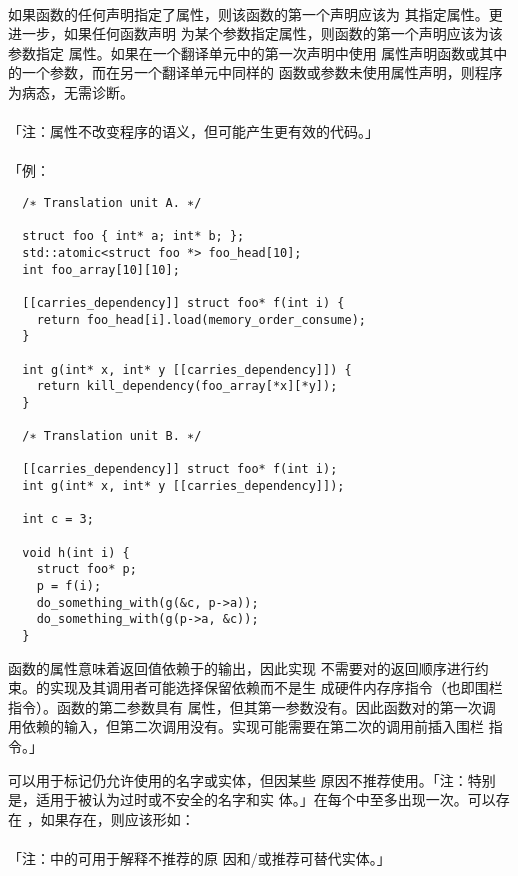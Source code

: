 \paragraph{}
如果函数的任何声明指定了属性，则该函数的第一个声明应该为
其指定属性。更进一步，如果任何函数声明
为某个参数指定属性，则函数的第一个声明应该为该参数指定
属性。如果在一个翻译单元中的第一次声明中使用
属性声明函数或其中的一个参数，而在另一个翻译单元中同样的
函数或参数未使用属性声明，则程序为病态，无需诊断。

\paragraph{}
「注：属性不改变程序的语义，但可能产生更有效的代码。」

\paragraph{}
「例：
\begin{lstlisting}
  /∗ Translation unit A. ∗/

  struct foo { int* a; int* b; };
  std::atomic<struct foo *> foo_head[10];
  int foo_array[10][10];

  [[carries_dependency]] struct foo* f(int i) {
    return foo_head[i].load(memory_order_consume);
  }

  int g(int* x, int* y [[carries_dependency]]) {
    return kill_dependency(foo_array[*x][*y]);
  }

  /∗ Translation unit B. ∗/

  [[carries_dependency]] struct foo* f(int i);
  int g(int* x, int* y [[carries_dependency]]);

  int c = 3;

  void h(int i) {
    struct foo* p;
    p = f(i);
    do_something_with(g(&c, p->a));
    do_something_with(g(p->a, &c));
  }
\end{lstlisting}
函数的属性意味着返回值依赖于的输出，因此实现
不需要对的返回顺序进行约束。的实现及其调用者可能选择保留依赖而不是生
成硬件内存序指令（也即围栏指令）。函数的第二参数具有
属性，但其第一参数没有。因此函数对的第一次调
用依赖的输入，但第二次调用没有。实现可能需要在第二次的调用前插入围栏
指令。」

 可以用于标记仍允许使用的名字或实体，但因某些
原因不推荐使用。「注：特别是，适用于被认为过时或不安全的名字和实
体。」在每个中至多出现一次。可以存在
，如果存在，则应该形如：                        \\
\mbox{\qquad \tm{(}  \nt{)}}                               \\
「注：中的可用于解释不推荐的原
因和/或推荐可替代实体。」

